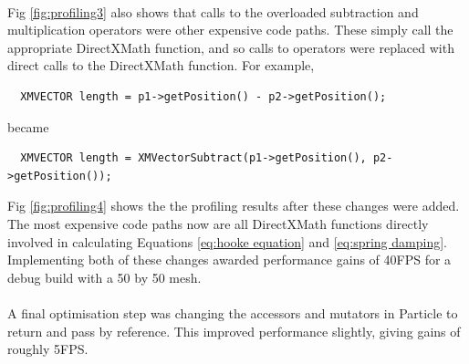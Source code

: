 \\Fig \ref{fig:profiling3} also shows that calls to the overloaded subtraction and multiplication operators were other expensive code paths. These simply call the appropriate DirectXMath function, and so calls to operators were replaced with direct calls to the DirectXMath function. For example, 
\begin{verbatim}
  XMVECTOR length = p1->getPosition() - p2->getPosition();
\end{verbatim}
became
\begin{verbatim}
  XMVECTOR length = XMVectorSubtract(p1->getPosition(), p2->getPosition());
\end{verbatim}
Fig \ref{fig:profiling4} shows the the profiling results after these changes were added. The most expensive code paths now are all DirectXMath functions directly involved in calculating Equations \ref{eq:hooke equation} and \ref{eq:spring damping}.
\\Implementing both of these changes awarded performance gains of 40FPS for a debug build with a 50 by 50 mesh.
\\\\A final optimisation step was changing the accessors and mutators in Particle to return and pass by reference. This improved performance slightly, giving gains of roughly 5FPS.
